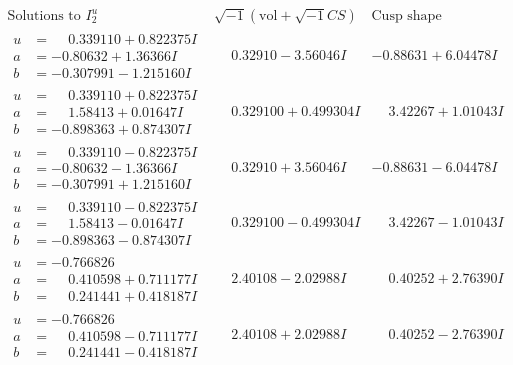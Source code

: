\documentclass[1p]{elsarticle_modified}
\theoremstyle{definition}
\newcommand{\I}{\sqrt{-1}}
\begin{document}
$$\begin{array}{c|c|c}  
\text{Solutions to }I^u_{2}& \I (\text{vol} + \sqrt{-1}CS) & \text{Cusp shape}\\
 \hline 
\begin{aligned}
u &= \phantom{-}0.339110 + 0.822375 I \\
a &= -0.80632 + 1.36366 I \\
b &= -0.307991 - 1.215160 I\end{aligned}
 & \phantom{-}0.32910 - 3.56046 I & -0.88631 + 6.04478 I \\ \hline\begin{aligned}
u &= \phantom{-}0.339110 + 0.822375 I \\
a &= \phantom{-}1.58413 + 0.01647 I \\
b &= -0.898363 + 0.874307 I\end{aligned}
 & \phantom{-}0.329100 + 0.499304 I & \phantom{-}3.42267 + 1.01043 I \\ \hline\begin{aligned}
u &= \phantom{-}0.339110 - 0.822375 I \\
a &= -0.80632 - 1.36366 I \\
b &= -0.307991 + 1.215160 I\end{aligned}
 & \phantom{-}0.32910 + 3.56046 I & -0.88631 - 6.04478 I \\ \hline\begin{aligned}
u &= \phantom{-}0.339110 - 0.822375 I \\
a &= \phantom{-}1.58413 - 0.01647 I \\
b &= -0.898363 - 0.874307 I\end{aligned}
 & \phantom{-}0.329100 - 0.499304 I & \phantom{-}3.42267 - 1.01043 I \\ \hline\begin{aligned}
u &= -0.766826\phantom{ +0.000000I} \\
a &= \phantom{-}0.410598 + 0.711177 I \\
b &= \phantom{-}0.241441 + 0.418187 I\end{aligned}
 & \phantom{-}2.40108 - 2.02988 I & \phantom{-}0.40252 + 2.76390 I \\ \hline\begin{aligned}
u &= -0.766826\phantom{ +0.000000I} \\
a &= \phantom{-}0.410598 - 0.711177 I \\
b &= \phantom{-}0.241441 - 0.418187 I\end{aligned}
 & \phantom{-}2.40108 + 2.02988 I & \phantom{-}0.40252 - 2.76390 I \\ \hline\begin{aligned}

\end{aligned}
\end{array}$$
\end{document}
